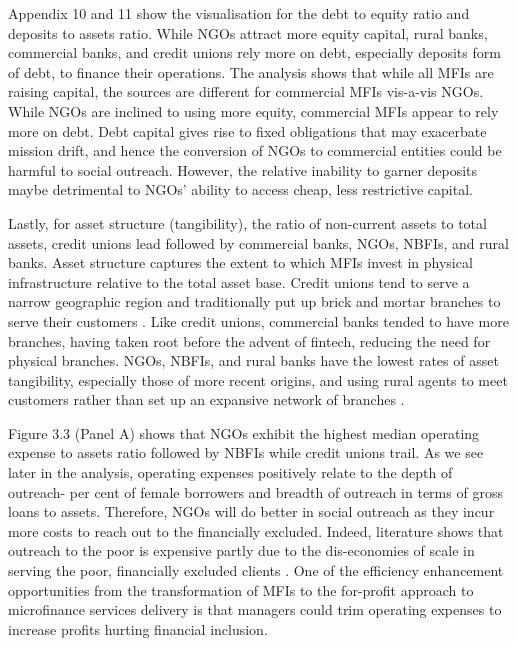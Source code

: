 \documentclass[a4paper, nobind]{templates/ociamthesis}
\begin{document}
Appendix 10 and 11 show the visualisation for the debt to equity ratio and deposits to assets ratio. While NGOs attract more equity capital, rural banks, commercial banks, and credit unions rely more on debt, especially deposits form of debt, to finance their operations. The analysis shows that while all MFIs are raising capital, the sources are different for commercial MFIs vis-a-vis NGOs. While NGOs are inclined to using more equity, commercial MFIs appear to rely more on debt. Debt capital gives rise to fixed obligations that may exacerbate mission drift, and hence the conversion of NGOs to commercial entities could be harmful to social outreach. However, the relative inability to garner deposits maybe detrimental to NGOs' ability to access cheap, less restrictive capital.

Lastly, for asset structure (tangibility), the ratio of non-current assets to total assets, credit unions lead followed by commercial banks, NGOs, NBFIs, and rural banks. Asset structure captures the extent to which MFIs invest in physical infrastructure relative to the total asset base. Credit unions tend to serve a narrow geographic region and traditionally put up brick and mortar branches to serve their customers \autocite{mckillop2011credit}. Like credit unions, commercial banks tended to have more branches, having taken root before the advent of fintech, reducing the need for physical branches. NGOs, NBFIs, and rural banks have the lowest rates of asset tangibility, especially those of more recent origins, and using rural agents to meet customers rather than set up an expansive network of branches \autocite{kent2013bankers}.

Figure 3.3 (Panel A) shows that NGOs exhibit the highest median operating expense to assets ratio followed by NBFIs while credit unions trail. As we see later in the analysis, operating expenses positively relate to the depth of outreach- per cent of female borrowers and breadth of outreach in terms of gross loans to assets. Therefore, NGOs will do better in social outreach as they incur more costs to reach out to the financially excluded. Indeed, literature shows that outreach to the poor is expensive partly due to the dis-economies of scale in serving the poor, financially excluded clients \autocite{mia2017mission}. One of the efficiency enhancement opportunities from the transformation of MFIs to the for-profit approach to microfinance services delivery is that managers could trim operating expenses to increase profits hurting financial inclusion.
\end{document}
